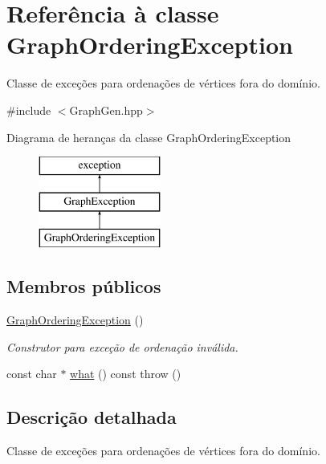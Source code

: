 \hypertarget{classGraphOrderingException}{}\section{Referência à classe Graph\+Ordering\+Exception}
\label{classGraphOrderingException}


Classe de exceções para ordenações de vértices fora do domínio.  




{\ttfamily \#include $<$Graph\+Gen.\+hpp$>$}

Diagrama de heranças da classe Graph\+Ordering\+Exception\begin{figure}[H]
\begin{center}
\leavevmode
\includegraphics[height=3.000000cm]{classGraphOrderingException}
\end{center}
\end{figure}
\subsection*{Membros públicos}
\begin{DoxyCompactItemize}
\item 
\mbox{\label{classGraphOrderingException_ac24ad9d03e3be6a3c2c43d233413412f}} 
\mbox{\hyperlink{classGraphOrderingException_ac24ad9d03e3be6a3c2c43d233413412f}{Graph\+Ordering\+Exception}} ()
\begin{DoxyCompactList}\small\item\em Construtor para exceção de ordenação inválida. \end{DoxyCompactList}\item 
const char $\ast$ \mbox{\hyperlink{classGraphOrderingException_a38d6f4e461cd40c0d2e8c07e7a5d6bef}{what}} () const  throw ()
\end{DoxyCompactItemize}


\subsection{Descrição detalhada}
Classe de exceções para ordenações de vértices fora do domínio. 


